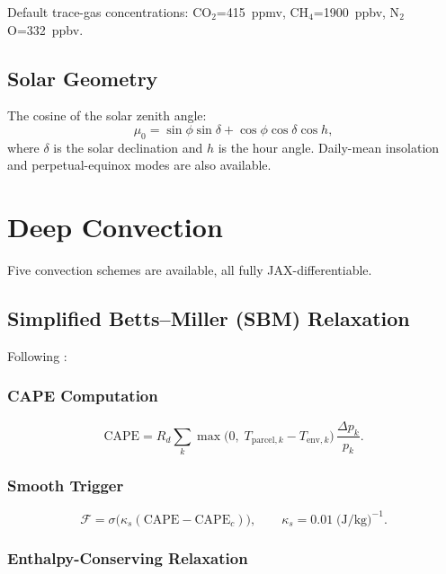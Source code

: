 \documentclass[11pt,twoside]{report}
\newcommand{\Rd}{R_d}
\begin{document}
Default trace-gas concentrations: CO$_2$=415~ppmv, CH$_4$=1900~ppbv,
N$_2$O=332~ppbv.

\subsection{Solar Geometry}

The cosine of the solar zenith angle:
\begin{equation}
  \mu_0 = \sin\phi\sin\delta + \cos\phi\cos\delta\cos h,
\end{equation}
where $\delta$ is the solar declination and $h$ is the hour angle.
Daily-mean insolation and perpetual-equinox modes are also available.


\section{Deep Convection}
\label{sec:convection}

Five convection schemes are available, all fully JAX-differentiable.

\subsection{Simplified Betts--Miller (SBM) Relaxation}
\label{sec:sbm}

Following \citet{Frierson2007}:

\subsubsection{CAPE Computation}
\begin{equation}
  \mathrm{CAPE} = \Rd\sum_k
  \max\!\bigl(0,\;T_{\mathrm{parcel},k}-T_{\mathrm{env},k}\bigr)\,
  \frac{\Delta p_k}{p_k}.
\end{equation}

\subsubsection{Smooth Trigger}
\begin{equation}
  \mathcal{F} = \sigma\!\bigl(\kappa_s(\mathrm{CAPE}-\mathrm{CAPE}_c)\bigr),
  \qquad \kappa_s=0.01\;\text{(J/kg)}^{-1}.
\end{equation}

\subsubsection{Enthalpy-Conserving Relaxation}
\end{document}
